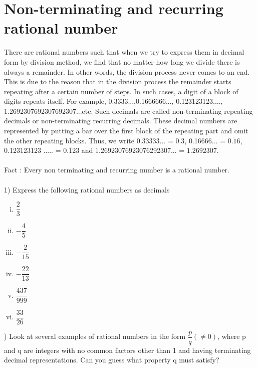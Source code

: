 \documentclass[a4paper,10pt]{article}
\begin{document}
\section{Non-terminating and recurring rational number}
There are rational numbers such that when we try to express them in
decimal form by
division method, we find that no matter how long we divide there is
always a remainder. In
other words, the division process never comes to an end. This is due to
the reason that in the
division process the remainder starts repeating after a certain number
of steps. In such cases,
a digit of a block of digits repeats itself. For example,
0.3333...,0.1666666...,
0.123123123...., 1.2692307692307692307...etc. Such decimals are called
non-terminating
repeating decimals or non-terminating recurring decimals. These decimal
numbers are
represented by putting a bar over the first block of the repeating part
and omit the other
repeating blocks. Thus, we write 0.33333... = 0.3, 0.16666... =
$\overline{0.16}$, 0.123123123 ..... = $\overline{0.123}$ and
1.26923076923076292307... = $\overline{1.2692307}$.\\\\
Fact : Every non terminating and recurring number is a rational
number.\\\\
1) Express the following rational numbers as decimals
\begin{multicols}{5}
\begin{enumerate}[(i)]
 \item $\dfrac{2}{3}$
 \item $-\dfrac{4}{5}$
 \item $-\dfrac{2}{15}$
 \item $-\dfrac{22}{13}$
 \item $\dfrac{437}{999}$
 \item $\dfrac{33}{26}$
\end{enumerate}
\end{multicols}
) Look at several examples of rational numbers in the form
$\dfrac{p}{q} (\neq 0)$, where p and q are integers with no common
factors other than 1 and having terminating decimal representations. Can
you guess what property q must satisfy?
\end{document}

